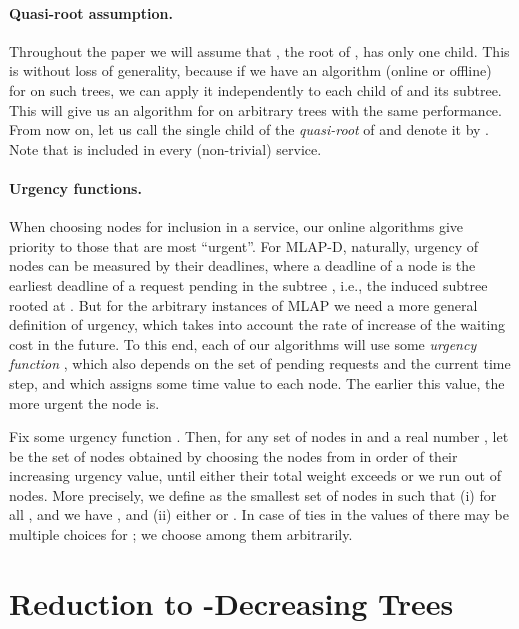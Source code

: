 \documentclass[a4paper]{article}
\newcommand{\MLAP}{\mbox{\rm\textsf{MLAP}}}
\newcommand{\MLAPD}{\mbox{\rm\textsf{MLAP-D}}}
\begin{document}
\paragraph{Quasi-root assumption.}

Throughout the paper we will
assume that , the root of , has only one child. This
is without loss of generality, because if we have an algorithm (online
or offline) for  on such trees, we can apply it independently to each
child of  and its subtree. This will give us an algorithm for  on
arbitrary trees with the same performance. From now on, let us call
the single child of  the \emph{quasi-root} of  and denote it by
.  Note that  is included in every (non-trivial) service.


\paragraph{Urgency functions.}

When choosing nodes for inclusion in a service, our online algorithms
give priority to those that are most ``urgent''.  For {\MLAPD},
naturally, urgency of nodes can be measured by their deadlines, where
a deadline of a node  is the earliest deadline of a request pending
in the subtree , i.e., the induced subtree rooted at .
But for the arbitrary instances of {\MLAP} we need a more general
definition of urgency, which takes into account the rate of increase
of the waiting cost in the future.  To this end, each of our
algorithms will use some \emph{urgency function} , which also depends on the set of pending
requests and the current time step, and which assigns some time value
to each node. The earlier this value, the more urgent the node is.

Fix some urgency function . Then,
for any set  of nodes in  and a real number , let
 be the set of nodes obtained by choosing the
nodes from  in order of their increasing urgency value, until either their total weight exceeds 
or we run out of nodes.
More precisely, we define  as the
smallest set of nodes in  such that 
(i)  for all , and  we have , 
and 
(ii) either  or
.
In case of ties in the values of  there may be multiple choices for
; we choose among them arbitrarily.



\section{Reduction to -Decreasing Trees}
\label{sec: reduction to L-decreasing trees}
\end{document}
